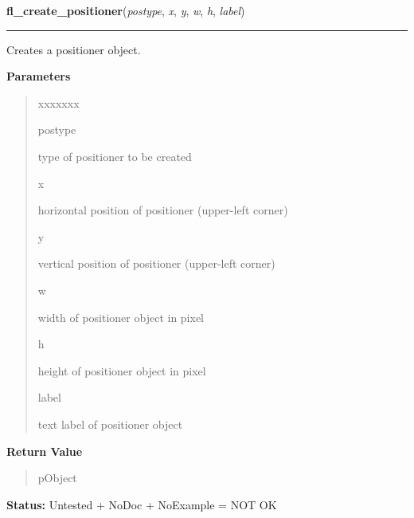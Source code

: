 \hspace{.8\funcindent}\begin{boxedminipage}{\funcwidth}

    \raggedright \textbf{fl\_create\_positioner}(\textit{postype}, \textit{x}, \textit{y}, \textit{w}, \textit{h}, \textit{label})

    \vspace{-1.5ex}

    \rule{\textwidth}{0.5\fboxrule}
\setlength{\parskip}{2ex}
    Creates a positioner object.

\setlength{\parskip}{1ex}
      \textbf{Parameters}
      \vspace{-1ex}

      \begin{quote}
        \begin{Ventry}{xxxxxxx}

          \item[postype]

          type of positioner to be created

          \item[x]

          horizontal position of positioner (upper-left corner)

          \item[y]

          vertical position of positioner (upper-left corner)

          \item[w]

          width of positioner object in pixel

          \item[h]

          height of positioner object in pixel

          \item[label]

          text label of positioner object

        \end{Ventry}

      \end{quote}

      \textbf{Return Value}
    \vspace{-1ex}

      \begin{quote}
      pObject

      \end{quote}

\textbf{Status:} Untested + NoDoc + NoExample = NOT OK



    \end{boxedminipage}

